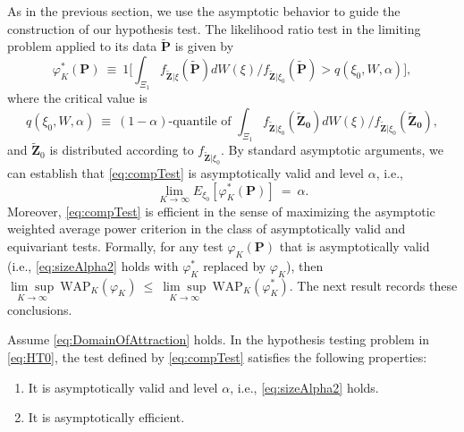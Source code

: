 As in the previous section, we use the asymptotic behavior to guide the construction of our hypothesis test. The likelihood ratio test in the limiting problem applied to its data $\mathbf{\tilde{P}}$ is given by
\begin{equation}
\varphi _{K}^{\ast }( \mathbf{P}) 
~\equiv ~1\bigg[ {\int_{\Xi _{1}}f_{\mathbf{\tilde{Z}}|\xi }( \mathbf{\tilde{P}}) dW( \xi ) }/{f_{\mathbf{\tilde{Z}}|\xi _{0}}( \mathbf{\tilde{P}}) }>q( \xi _{0},W,\alpha ) \bigg] ,  \label{eq:compTest}
\end{equation}
where the critical value is
\begin{equation*}
q( \xi _{0},W,\alpha ) ~\equiv ~( 1-\alpha ) \text{-quantile of }{\int_{\Xi _{1}}f_{\mathbf{\tilde{Z}}|\xi _{0}}(  \mathbf{\tilde{Z}_0}) dW( \xi ) }/{f_{\mathbf{\tilde{Z}}|\xi _{0}}( \mathbf{\tilde{Z}_0}) },
\end{equation*}
and $\mathbf{\tilde{Z}}_{0}$ is distributed according to $f_{\mathbf{\tilde{Z}}|\xi _{0}}$. By standard asymptotic arguments, we can establish that \eqref{eq:compTest} is asymptotically valid and level $\alpha $, i.e.,
\begin{equation}
\lim_{K\to \infty }E_{\xi_0 }[ \varphi _{K}^{\ast }( \mathbf{P}) ] ~= ~\alpha .  \label{eq:sizeAlpha2}
\end{equation}
Moreover, \eqref{eq:compTest} is efficient in the sense of maximizing the asymptotic weighted average power criterion in the class of asymptotically valid and equivariant tests. Formally, for any test $\varphi _{K}( \mathbf{P}) $ that is asymptotically valid (i.e., \eqref{eq:sizeAlpha2} holds with $\varphi _{K}^{\ast }$ replaced by $\varphi _{K}$), then
$
\underset{K\to \infty }{\lim \sup }~\mathrm{WAP}_{K}( \varphi_{K}) ~\leq ~\underset{K\to \infty }{\lim \sup }~\mathrm{WAP}_{K}( \varphi _{K}^{\ast }) .
$
The next result records these conclusions.

\begin{theorem}\label{thm:compTest}
Assume \eqref{eq:DomainOfAttraction} holds. In the hypothesis testing problem in \eqref{eq:HT0}, the test defined by \eqref{eq:compTest} satisfies the following properties:
\begin{enumerate}
\item It is asymptotically valid and level $\alpha $, i.e., \eqref{eq:sizeAlpha2} holds.
\item It is asymptotically efficient.
\end{enumerate}
\end{theorem}

